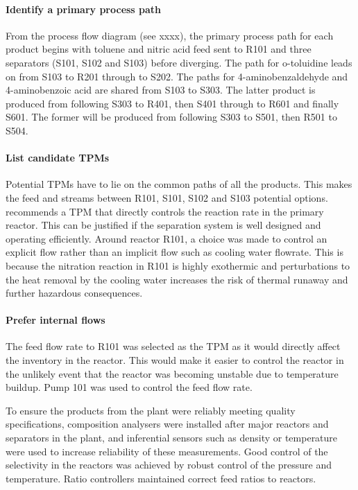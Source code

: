 \paragraph{Identify a primary process path}
From the process flow diagram (see xxxx), the primary process path for each product begins with toluene and nitric acid feed sent to R101 and three separators (S101, S102 and S103) before diverging. The path for o-toluidine leads on from S103 to R201 through to S202. The paths for 4-aminobenzaldehyde and 4-aminobenzoic acid are shared from S103 to S303. The latter product is produced from following S303 to R401, then S401 through to R601 and finally S601. The former will be produced from following S303 to S501, then R501 to S504.  

\paragraph{List candidate TPMs}
Potential TPMs have to lie on the common paths of all the products. This makes the feed and streams between R101, S101, S102 and S103 potential options. \textcite{} recommends a TPM that directly controls the reaction rate in the primary reactor. This can be justified if the separation system is well designed and operating efficiently. Around reactor R101, a choice was made to control an explicit flow rather than an implicit flow such as cooling water flowrate. This is because the nitration reaction in R101 is highly exothermic and perturbations to the heat removal by the cooling water increases the risk of thermal runaway and further hazardous consequences. 

\paragraph{Prefer internal flows}
The feed flow rate to R101 was selected as the TPM as it would directly affect the inventory in the reactor. This would make it easier to control the reactor in the unlikely event that the reactor was becoming unstable due to temperature buildup. Pump 101 was used to control the feed flow rate.

To ensure the products from the plant were reliably meeting quality specifications, composition analysers were installed after major reactors and separators in the plant, and inferential sensors such as density or temperature were used to increase reliability of these measurements. Good control of the selectivity in the reactors was achieved by robust control of the pressure and temperature. Ratio controllers maintained correct feed ratios to reactors.

